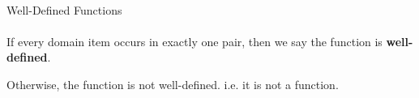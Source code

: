 \documentclass{ximera}
\begin{document}
\quad \\


\begin{definition} Well-Defined Functions \\
\quad \\
If every domain item occurs in exactly one pair, then we say the function is \textbf{well-defined}. 

Otherwise, the function is not well-defined. i.e. it is not a function.

\end{definition}
\end{document}
